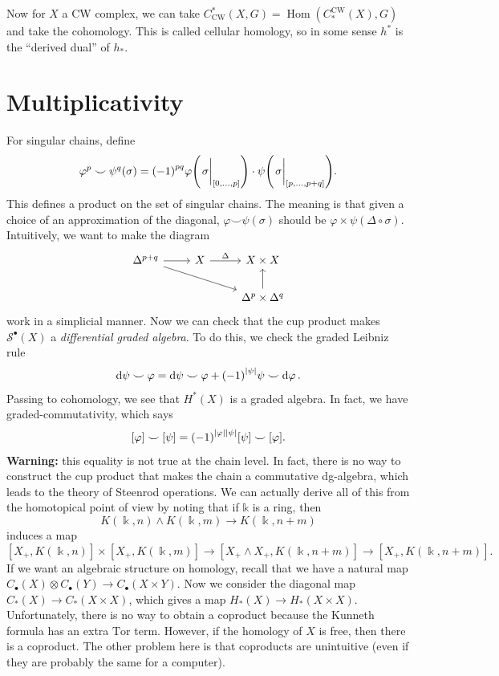 \documentclass[leqno, openany]{memoir}
\theoremstyle{definition}
\theoremstyle{remark}
\theoremstyle{plain}
\theoremstyle{definition}
\theoremstyle{remark}
\renewcommand{\k}{\Bbbk}
\newcommand{\mc}[1]{\mathcal{#1}}
\newcommand{\mr}[1]{\mathrm{#1}}
\DeclareMathOperator{\Hom}{Hom}
\begin{document}
Now for $X$ a CW complex, we can take $C_{\mr{CW}}^*(X, G) = \Hom(C_*^{\mr{CW}}(X), G)$ and take the cohomology. This is called cellular homology, so in some sense $h^*$ is the ``derived dual'' of $h_*$.

\section{Multiplicativity}%
\label{sec:multiplicativity}

For singular chains, define
\[ \varphi^p \smile \psi^q (\sigma) = {(-1)}^{pq} \varphi\qty(\eval{\sigma}_{[0, \ldots, p]}) \cdot \psi\qty(\eval{\sigma}_{[p, \ldots, p+q]}). \]
This defines a product on the set of singular chains. The meaning is that given a choice of an approximation of the diagonal, $\varphi \smile \psi (\sigma)$ should be $\varphi \times \psi (\Delta \circ \sigma)$. Intuitively, we want to make the diagram
\begin{equation*}
\begin{tikzcd}
    \Delta^{p+q} \arrow{r} \arrow{drr} & X \arrow{r}{\Delta} & X \times X \\
                                       & & \Delta^p \times \Delta^q \arrow{u}
\end{tikzcd}
\end{equation*}
work in a simplicial manner. Now we can check that the cup product makes $\mc{S}^{\bullet}(X)$ a \textit{differential graded algebra}. To do this, we check the graded Leibniz rule
\[ \dd{\psi \smile \varphi} = \dd{\psi} \smile \varphi + {(-1)}^{\abs{\psi}} \psi \smile \dd{\varphi}. \]
Passing to cohomology, we see that $H^*(X)$ is a graded algebra. In fact, we have graded-commutativity, which says
\[ [\varphi] \smile [\psi] = {(-1)}^{\abs{\varphi}\abs{\psi}} [\psi] \smile [\varphi]. \]
\textbf{Warning:} this equality is not true at the chain level. In fact, there is no way to construct the cup product that makes the chain a commutative dg-algebra, which leads to the theory of Steenrod operations. We can actually derive all of this from the homotopical point of view by noting that if $\mathbb{k}$ is a ring, then 
\[ K(\k, n) \wedge K(\k, m) \to K(\k, n+m) \]
induces a map
\[ [X_+, K(\k, n)] \times [X_+, K(\k, m)] \to [X_+ \wedge X_+, K(\k, n+m)] \to [X_+, K(\k, n+m)]. \]
If we want an algebraic structure on homology, recall that we have a natural map $C_{\bullet}(X) \otimes C_{\bullet}(Y) \to C_{\bullet}(X \times Y)$. Now we consider the diagonal map $C_*(X) \to C_*(X \times X)$, which gives a map $H_*(X) \to H_*(X \times X)$. Unfortunately, there is no way to obtain a coproduct because the Kunneth formula has an extra $\mr{Tor}$ term. However, if the homology of $X$ is free, then there is a coproduct. The other problem here is that coproducts are unintuitive (even if they are probably the same for a computer). 
\end{document}
